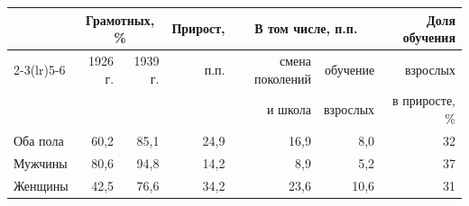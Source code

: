 \begin{tabular}{lrrrrrr}
\toprule
 & \multicolumn{2}{c}{Грамотных, \%} & Прирост, & \multicolumn{2}{c}{В том числе, п.п.} & Доля обучения \\
\cmidrule(lr){2-3}\cmidrule(lr){5-6}
 & 1926 г. & 1939 г. & п.п. & смена поколений & обучение & взрослых \\
 & & & & и школа & взрослых & в приросте, \% \\
\midrule
Оба пола & 60,2 & 85,1 & 24,9 & 16,9 & 8,0 & 32 \\
Мужчины & 80,6 & 94,8 & 14,2 & 8,9 & 5,2 & 37 \\
Женщины & 42,5 & 76,6 & 34,2 & 23,6 & 10,6 & 31 \\
\bottomrule
\end{tabular}
